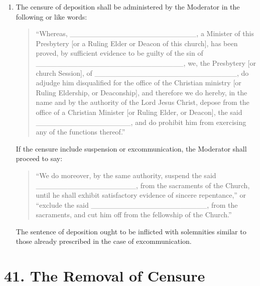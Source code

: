 \documentclass[
]{book}
\begin{document}
\begin{enumerate}
\def\labelenumi{\arabic{enumi}.}
\setcounter{enumi}{6}
\item
  The censure of deposition shall be administered by the Moderator in the following or like words:

  \begin{quote}
  ``Whereas, \_\_\_\_\_\_\_\_\_\_\_\_\_\_\_\_\_\_\_\_\_\_\_\_, a Minister of this Presbytery {[}or a Ruling Elder or Deacon of this church{]}, has been proved, by sufficient evidence to be guilty of the sin of \_\_\_\_\_\_\_\_\_\_\_\_\_\_\_\_\_\_\_\_\_\_\_\_\_\_\_\_, we, the Presbytery {[}or church Session{]}, of \_\_\_\_\_\_\_\_\_\_\_\_\_\_\_\_\_\_\_\_\_\_\_\_\_\_\_, do adjudge him disqualified for the office of the Christian ministry {[}or Ruling Eldership, or Deaconship{]}, and therefore we do hereby, in the name and by the authority of the Lord Jesus Christ, depose from the office of a Christian Minister {[}or Ruling Elder, or Deacon{]}, the said \_\_\_\_\_\_\_\_\_\_\_\_\_\_\_\_\_\_, and do prohibit him from exercising any of the functions thereof.''
  \end{quote}

  If the censure include suspension or excommunication, the Moderator shall proceed to say:

  \begin{quote}
  ``We do moreover, by the same authority, suspend the said \_\_\_\_\_\_\_\_\_\_\_\_\_\_\_\_\_\_\_, from the sacraments of the Church, until he shall exhibit satisfactory evidence of sincere repentance,'' or ``exclude the said \_\_\_\_\_\_\_\_\_\_\_\_\_\_\_\_\_\_\_\_\_\_, from the sacraments, and cut him off from the fellowship of the Church.''
  \end{quote}

  The sentence of deposition ought to be inflicted with solemnities similar to those already prescribed in the case of excommunication.
\end{enumerate}

\hypertarget{the-removal-of-censure}{%
\section*{41. The Removal of Censure}\label{the-removal-of-censure}}

\protect\hypertarget{chapter-slug-41-the-removal-of-censure}{\href{}{}}
\end{document}
